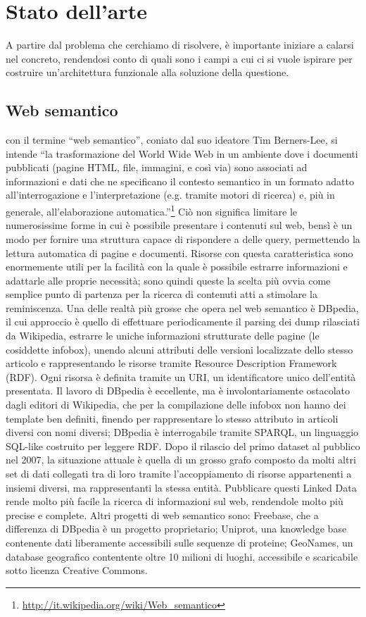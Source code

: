 \documentclass[sigproc-sp.tex]{subfiles}
\begin{document}
\section{Stato dell'arte}
A partire dal problema che cerchiamo di risolvere, è importante iniziare a calarsi nel concreto, rendendosi conto di quali sono i campi a cui ci si vuole ispirare per costruire un’architettura funzionale alla soluzione della questione.

\subsection{Web semantico}
con il termine “web semantico”, coniato dal suo ideatore Tim Berners-Lee, si intende “la trasformazione del World Wide Web in un ambiente dove i documenti pubblicati (pagine HTML, file, immagini, e così via) sono associati ad informazioni e dati che ne specificano il contesto semantico in un formato adatto all'interrogazione e l'interpretazione (e.g. tramite motori di ricerca) e, più in generale, all'elaborazione automatica.”\footnote{\url{http://it.wikipedia.org/wiki/Web_semantico}}
Ciò non significa limitare le numerosissime forme in cui è possibile presentare i contenuti sul web, bensì è un modo per fornire una struttura capace di rispondere a delle query, permettendo la lettura automatica di pagine e documenti. 
Risorse con questa caratteristica sono enormemente utili per la facilità con la quale è possibile estrarre informazioni e adattarle alle proprie necessità; sono quindi queste la scelta più ovvia come semplice punto di partenza per la ricerca di contenuti atti a stimolare la reminiscenza.
Una delle realtà più grosse che opera nel web semantico è DBpedia, il cui approccio è quello di effettuare periodicamente il parsing dei dump rilasciati da Wikipedia, estrarre le uniche informazioni strutturate delle pagine (le cosiddette infobox), unendo alcuni attributi delle versioni localizzate dello stesso articolo e rappresentando le risorse tramite Resource Description Framework (RDF). Ogni risorsa è definita tramite un URI, un identificatore unico dell’entità presentata. Il lavoro di DBpedia è eccellente, ma è involontariamente ostacolato dagli editori di Wikipedia, che per la compilazione delle infobox non hanno dei template ben definiti, finendo per rappresentare lo stesso attributo in articoli diversi con nomi diversi; DBpedia è interrogabile tramite SPARQL, un linguaggio SQL-like costruito per leggere RDF. Dopo il rilascio del primo dataset al pubblico nel 2007, la situazione attuale è quella di un grosso grafo composto da molti altri set di dati collegati tra di loro tramite l’accoppiamento di risorse appartenenti a insiemi diversi, ma rappresentanti la stessa entità. Pubblicare questi Linked Data rende molto più facile la ricerca di informazioni sul web, rendendole molto più precise e complete. Altri progetti di web semantico sono: Freebase, che a differenza di DBpedia è un progetto proprietario; Uniprot, una knowledge base contenente dati liberamente accessibili sulle sequenze di proteine; GeoNames, un database geografico contentente oltre 10 milioni di luoghi, accessibile e scaricabile sotto licenza Creative Commons.
\end{document}
